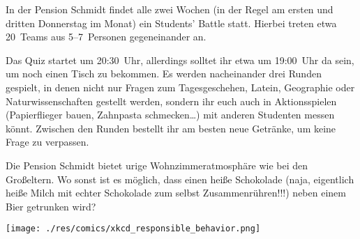 \begin{multicols}{2}
In der Pension Schmidt findet alle zwei Wochen (in der Regel am ersten und dritten Donnerstag im Monat) ein Students' Battle statt. Hierbei treten etwa 20~Teams aus 5--7~Personen gegeneinander an.

Das Quiz startet um 20:30~Uhr, allerdings solltet ihr etwa um 19:00~Uhr da sein, um noch einen Tisch zu bekommen. Es werden nacheinander drei Runden gespielt, in denen nicht nur Fragen zum Tagesgeschehen, Latein, Geographie oder Naturwissenschaften gestellt werden, sondern ihr euch auch in Aktionsspielen (Papierflieger bauen, Zahnpasta schmecken\dots) mit anderen Studenten messen könnt. Zwischen den Runden bestellt ihr am besten neue Getränke, um keine Frage zu verpassen.

Die Pension Schmidt bietet urige Wohnzimmeratmosphäre wie bei den Großeltern. Wo sonst ist es möglich, dass einen heiße Schokolade (naja, eigentlich heiße Milch mit echter Schokolade zum selbst Zusammenrühren!!!) neben einem Bier getrunken wird?
\vspace{1.6cm}

\end{multicols}
\begin{center}
\texttt{[image: ./res/comics/xkcd\_responsible\_behavior.png]}
\end{center}

